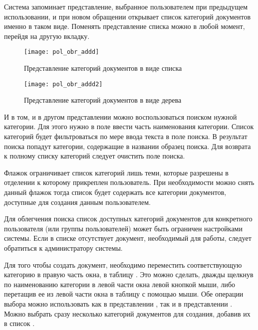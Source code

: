 Система запоминает представление, выбранное пользователем при предыдущем использовании, и при новом обращении открывает список категорий документов именно в таком виде. Поменять представление списка можно в любой момент, перейдя на другую вкладку.

\begin{figure}[ht]\centering
 \texttt{[image: pol\_obr\_addd]}
 \caption{Представление категорий документов в виде списка}
 \label{img_pol_obr_addd}
\end{figure}

\begin{figure}[ht]\centering
 \texttt{[image: pol\_obr\_addd2]}
 \caption{Представление категорий документов в виде дерева}
 \label{img_pol_obr_addd2}
\end{figure}

И в том, и в другом представлении можно воспользоваться поиском нужной категории. Для этого нужно в поле  ввести часть наименования категории. Список категорий будет фильтроваться по мере ввода текста в поле поиска. В результат поиска попадут категории, содержащие в названии образец поиска. Для возврата к полному списку категорий следует очистить поле поиска.

Флажок  ограничивает список категорий лишь теми, которые разрешены в отделении к которому прикреплен пользователь. При необходимости можно снять данный флажок тогда список будет содержать все категории документов, доступные для создания данным пользователем.

\begin{prim}
 Для облегчения поиска список доступных категорий документов для конкретного пользователя (или группы пользователей) может быть ограничен настройками системы. Если в списке отсутствует документ, необходимый для работы, следует обратиться к администратору системы.
\end{prim} 

Для того чтобы создать документ, необходимо переместить соответствующую категорию в правую часть окна, в таблицу . Это можно сделать, дважды щелкнув по наименованию категории в левой части окна левой кнопкой мыши, либо перетащив ее из левой части окна в таблицу  с помощью мыши. Обе операции выбора можно использовать как в представлении , так и в представлении . Можно выбрать сразу несколько категорий документов для создания, добавив их в список .
 
